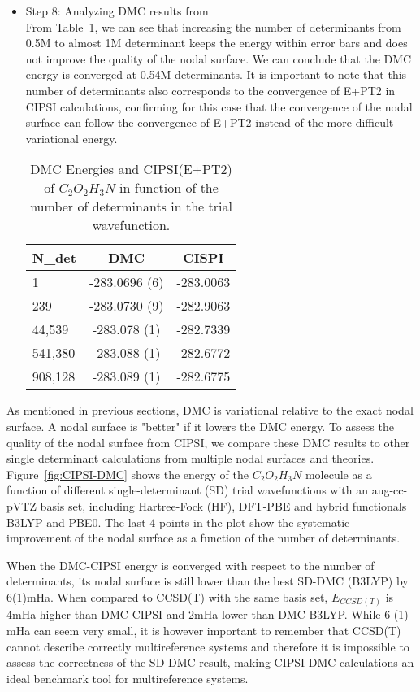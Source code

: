 \begin{itemize}
\item Step 8: Analyzing DMC results from \qmcpack \\

From Table~\ref{TAB:CIPSI-DMC}, we can see that increasing the number
of determinants from 0.5M to almost 1M determinant keeps the energy
within error bars and does not improve the quality of the nodal
surface. We can conclude that the DMC energy is converged at 0.54M
determinants. It is important to note that this number of determinants
also corresponds to the convergence of E+PT2 in CIPSI calculations,
confirming for this case that the convergence of the nodal surface can
follow the convergence of E+PT2 instead of the more difficult
variational energy.


\begin{table}[t]
\centering
\caption{DMC Energies and CIPSI(E+PT2) of $C_2O_2H_3N$ in function of the number of determinants in the trial wavefunction.}
\label{TAB:CIPSI-DMC}
\begin{tabular}{l|c|c}
\hline 
N\_det & DMC& CISPI\\
\hline
1 & -283.0696 (6)&-283.0063\\
239 & -283.0730 (9)&-282.9063\\
44,539 & -283.078 (1)&-282.7339\\
541,380 & -283.088 (1)&-282.6772\\
908,128& -283.089  (1)&-282.6775\end{tabular}
\end{table}

\end{itemize}

As mentioned in previous sections, DMC is variational relative to the
exact nodal surface. A nodal surface is "better" if it lowers the DMC
energy. To assess the quality of the nodal surface from CIPSI, we
compare these DMC results to other single determinant calculations
from multiple nodal surfaces and theories. Figure~\ref{fig:CIPSI-DMC}
shows the energy of the $C_2O_2H_3N$ molecule as a function of
different single-determinant (SD) trial wavefunctions with an
aug-cc-pVTZ basis set, including Hartree-Fock (HF), DFT-PBE and hybrid
functionals B3LYP and PBE0. The last 4 points in the plot show the
systematic improvement of the nodal surface as a function of the
number of determinants. 

When the DMC-CIPSI energy is converged with respect to the number of
determinants, its nodal surface is still lower than the best SD-DMC
(B3LYP) by 6(1)mHa. When compared to CCSD(T) with the same basis set,
$E_{CCSD(T)}$ is 4mHa higher than DMC-CIPSI and 2mHa lower than
DMC-B3LYP. While 6 (1) mHa can seem very small, it is however
important to remember that CCSD(T) cannot describe correctly
multireference systems and therefore it is impossible to assess the
correctness of the SD-DMC result, making CIPSI-DMC calculations an
ideal benchmark tool for multireference systems.


